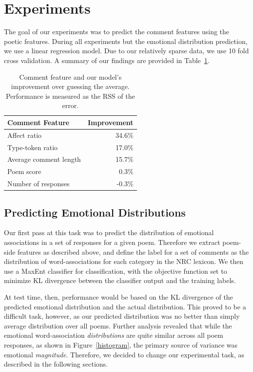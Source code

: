 \documentclass[11pt]{article}
\begin{document}
\section{Experiments}
The goal of our experiments was to predict the comment features using the poetic features. During all experiments but the emotional distribution prediction, we use a linear regression model. Due to our relatively sparse data, we use 10 fold cross validation. A summary of our findings are provided in Table~\ref{experiment-summary}.
\begin{table}['ht]
\begin{center}
\caption{Comment feature and our model's improvement over guessing the average. Performance is measured as the RSS of the error.}
\label{experiment-summary}
\vskip 0.12in
\begin{tabular}{lr}
\hline
Comment Feature  & Improvement
\\ \hline
Affect ratio & 34.6\%
\\ Type-token ratio & 17.0\%
\\ Average comment length & 15.7\%
\\ Poem score & 0.3\%
\\ Number of responses & -0.3\%
\\ \hline
\end{tabular}
\end{center}
\end{table}

\subsection{Predicting Emotional Distributions}
Our first pass at this task was to predict the distribution of emotional associations in a set of responses for a given poem. Therefore we extract poem-side features as described above, and define the label for a set of comments as the distribution of word-associations for each category in the NRC lexicon. We then use a MaxEnt classifier for classification, with the objective function set to minimize KL divergence between the classifier output and the training labels. 

At test time, then, performance would be based on the KL divergence of the predicted emotional distribution and the actual distribution. This proved to be a difficult task, however, as our predicted distribution was no better than simply average distribution over all poems. Further analysis revealed that while the emotional word-association \emph{distributions} are quite similar across all poem responses, as shown in Figure~\ref{histogram}, the primary source of variance was emotional \emph{magnitude}. Therefore, we decided to change our experimental task, as described in the following sections.
\end{document}
